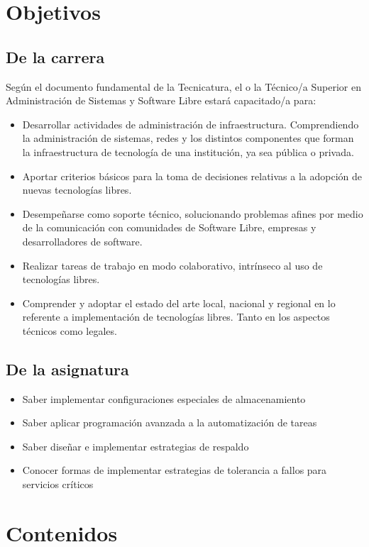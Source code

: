 
\section{Objetivos}
\subsection{De la carrera}
Según el documento fundamental de la Tecnicatura, el o la Técnico/a Superior en Administración de Sistemas y Software Libre estará capacitado/a para:
\begin{itemize}
	\item Desarrollar actividades de administración de infraestructura. Comprendiendo la administración de sistemas, redes y los distintos componentes que forman la
infraestructura de tecnología de una institución, ya sea pública o privada.
	\item Aportar criterios básicos para la toma de decisiones relativas a la adopción de nuevas tecnologías libres.
	\item Desempeñarse como soporte técnico, solucionando problemas afines por medio de la comunicación con comunidades de Software Libre, empresas y desarrolladores de
software.
	\item Realizar tareas de trabajo en modo colaborativo, intrínseco al uso de tecnologías libres.
	\item Comprender y adoptar el estado del arte local, nacional y regional en lo referente a implementación de tecnologías libres. Tanto en los aspectos técnicos como legales.
\end{itemize}
\subsection{De la asignatura}

\begin{itemize}
	\item Saber implementar configuraciones especiales de almacenamiento
	\item Saber aplicar programación avanzada a la automatización de tareas
	\item Saber diseñar e implementar estrategias de respaldo 
	\item Conocer formas de implementar estrategias de tolerancia a fallos para servicios críticos
\end{itemize}


\section {Contenidos}
